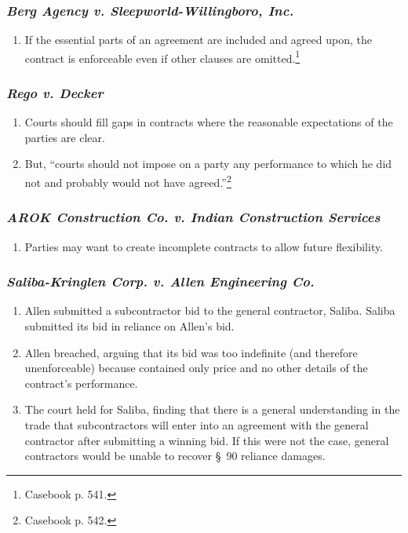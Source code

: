 \subsubsection{\emph{Berg Agency v. Sleepworld-Willingboro, Inc.}}

\begin{enumerate}
    \item If the essential parts of an agreement are included and agreed upon, 
    the contract is enforceable even if other clauses are 
    omitted.\footnote{Casebook p. 541.}
\end{enumerate}

\subsubsection{\emph{Rego v. Decker}}

\begin{enumerate}
    \item Courts should fill gaps in contracts where the reasonable 
    expectations of the parties are clear.
    \item But, ``courts should not impose on a party any performance to which 
    he did not and probably would not have agreed.''\footnote{Casebook p. 542.}
\end{enumerate}

\subsubsection{\emph{AROK Construction Co. v. Indian Construction Services}}

\begin{enumerate}
    \item Parties may want to create incomplete contracts to allow future 
    flexibility.
\end{enumerate}

\subsubsection{\emph{Saliba-Kringlen Corp. v. Allen Engineering Co.}}

\begin{enumerate}
    \item Allen submitted a subcontractor bid to the general contractor, 
    Saliba. Saliba submitted its bid in reliance on Allen's bid.
    \item Allen breached, arguing that its bid was too indefinite (and 
    therefore unenforceable) because contained only price and no other details 
    of the contract's performance.
    \item The court held for Saliba, finding that there is a general 
    understanding in the trade that subcontractors will enter into an 
    agreement with the general contractor after submitting a winning bid. If 
    this were not the case, general contractors would be unable to recover \S\ 
    90 reliance damages.
\end{enumerate}

